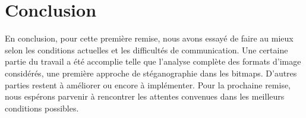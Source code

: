 \section {Conclusion}
En conclusion, pour cette première remise, nous avons essayé de faire au mieux selon les conditions actuelles et les difficultés de communication.
Une certaine partie du travail a été accomplie telle que l'analyse complète des formats d'image considérés, une première approche de stéganographie dans les bitmaps.
D'autres parties restent à améliorer ou encore à implémenter.
Pour la prochaine remise, nous espérons parvenir à rencontrer les attentes convenues dans les meilleurs conditions possibles.